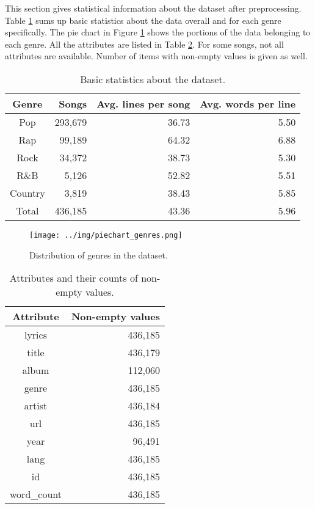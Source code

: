 This section gives statistical information about the dataset after preprocessing. Table \ref{basic_stats} sums up basic statistics about the data overall and for each genre specifically. The pie chart in Figure \ref{piechart_genres} shows the portions of the data belonging to each genre. All the attributes are listed in Table \ref{stats_nonempty_values}. For some songs, not all attributes are available. Number of items  with non-empty values is given as well.
\begin{table}[h!]
	\centering
	\begin{tabular}{c | r r r} 
		Genre & Songs & Avg. lines per song & Avg. words per line \\ 
		\midrule \midrule
		Pop & 293,679& 36.73 & 5.50\\
		Rap & 99,189 & 64.32 & 6.88 \\
		Rock & 34,372 & 38.73 & 5.30 \\
		R\&B & 5,126 & 52.82 & 5.51 \\
		Country & 3,819 & 38.43 & 5.85 \\
		\midrule
		Total & 436,185 & 43.36 & 5.96 \\
	\end{tabular}
	\caption{Basic statistics about the dataset.}
	\label{basic_stats}
\end{table}



\begin{figure}[h]\centering
	\texttt{[image: ../img/piechart\_genres.png]}
	\caption{Distribution of genres in the dataset.}\label{piechart_genres}
\end{figure}



\begin{table}[h!]
	\centering
	\begin{tabular}{| c | r |} 
		\hline
		Attribute & Non-empty values \\ [0.5ex] 
		\hline
		lyrics & 436,185 \\
		title & 436,179 \\
		album & 112,060 \\
		genre & 436,185 \\ 
		artist & 436,184 \\ 
		url & 436,185 \\
		year & 96,491 \\ 
		lang & 436,185 \\
		id & 436,185 \\
		word\_count & 436,185 \\
		\hline
	\end{tabular}
	\caption{Attributes and their counts of non-empty values.}
	\label{stats_nonempty_values}
\end{table}

